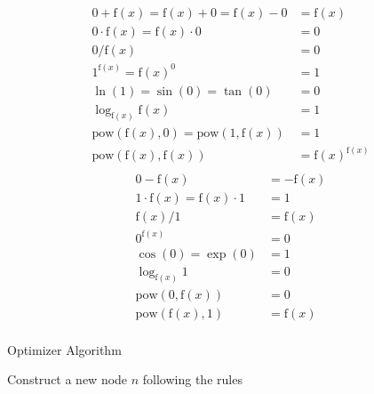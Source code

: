 \documentclass[a4paper,oneside]{book}
\begin{document}
\begin{multicols}{2}
    \begin{align*}
        0+\mathrm{f}(x)=\mathrm{f}(x)+0 =\mathrm{f}(x)-0              & =\mathrm{f}(x)                 \\
        0\cdot\mathrm{f}(x)=\mathrm{f}(x)\cdot0                       & =0                             \\
        0/\mathrm{f}(x)                                               & =0                             \\
        1^{\mathrm{f}(x)}=\mathrm{f}(x)^0                             & =1                             \\
        \ln(1)=\sin(0) =\tan(0)                                       & =0                             \\
        \log_{\mathrm{f}(x)} {\mathrm{f}(x)}                          & =1                             \\
        \mathrm{pow}(\mathrm{f}(x), 0)=\mathrm{pow}(1, \mathrm{f}(x)) & =1                             \\
        \mathrm{pow}(\mathrm{f}(x), \mathrm{f}(x))                    & =\mathrm{f}(x)^{\mathrm{f}(x)} \\
    \end{align*}\break
    \begin{align*}
        0-\mathrm{f}(x)                         & =-\mathrm{f}(x) \\
        1\cdot\mathrm{f}(x)=\mathrm{f}(x)\cdot1 & =1              \\
        \mathrm{f}(x)/1                         & =\mathrm{f}(x)  \\
        0^{\mathrm{f}(x)}                       & =0              \\
        \cos(0)=\exp(0)                         & =1              \\
        \log_{\mathrm{f}(x)} 1                  & =0              \\
        \mathrm{pow}(0, \mathrm{f}(x))          & =0              \\
        \mathrm{pow}(\mathrm{f}(x), 1)          & =\mathrm{f}(x)  \\
    \end{align*}
\end{multicols}

\begin{algorithm}[H]
    \caption{Optimizer Algorithm}\label{alg:3}
    \DontPrintSemicolon
    \BlankLine
    Construct a new node $n$ following the rules\;
    \;
\end{algorithm}
\end{document}
